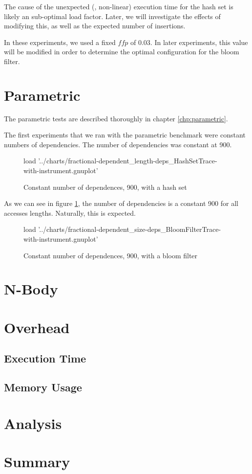 	The cause of the unexpected (\ie, non-linear) execution time for the hash set is likely an sub-optimal load factor. Later, we will investigate the effects of modifying this, as well as the expected number of insertions.
	
	In these experiments, we used a fixed $ffp$ of 0.03. In later experiments, this value will be modified in order to determine the optimal configuration for the bloom filter.

\section{Parametric} \label{sec:results/parametric}
The parametric tests are described thoroughly in chapter \ref{chp:parametric}.

The first experiments that we ran with the parametric benchmark were constant numbers of dependencies. The number of dependencies was constant at 900.

\begin{figure}[H]
	\centering
	\begin{gnuplot}[terminal=pdf]
		load '../charts/fractional-dependent_length-deps_HashSetTrace-with-instrument.gnuplot'
	\end{gnuplot}
	\caption{Constant number of dependences, 900, with a hash set}
	\label{chart:fractional-constant-900-hashset}
\end{figure}

As we can see in figure \ref{chart:fractional-constant-900-hashset}, the number of dependencies is a constant 900 for all accesses lengths. Naturally, this is expected.

\begin{figure}[H]
	\centering
	\begin{gnuplot}[terminal=pdf]
		load '../charts/fractional-dependent_size-deps_BloomFilterTrace-with-instrument.gnuplot'
	\end{gnuplot}
	\caption{Constant number of dependences, 900, with a bloom filter}
	\label{chart:fractional-constant-900-bloomfilter}
\end{figure}

\section{N-Body} \label{sec:results/nbody}

\section{Overhead} \label{sec:results/overhead}
	\subsection{Execution Time} \label{sec:results/overhead/time}
	
	\subsection{Memory Usage} \label{sec:results/overhead/memory}

\section{Analysis} \label{sec:results/analysis}

\section{Summary} \label{sec:results/summary}